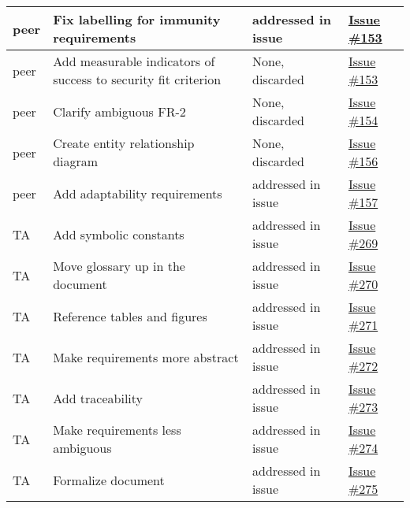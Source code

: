 \documentclass{article}
\begin{document}
\begin{longtable}{|p{2cm}|p{3.5cm}|p{4.5cm}|p{3cm}|}
peer & Fix labelling for immunity requirements & addressed in issue & \href{https://github.com/ssm-lab/capstone--source-code-optimizer/issues/153}{Issue \#153} \\
\hline

peer & Add measurable indicators of success to security fit criterion & None, discarded & \href{https://github.com/ssm-lab/capstone--source-code-optimizer/issues/153}{Issue \#153} \\
\hline

peer & Clarify ambiguous FR-2 & None, discarded & \href{https://github.com/ssm-lab/capstone--source-code-optimizer/issues/154}{Issue \#154} \\
\hline

peer & Create entity relationship diagram & None, discarded & \href{https://github.com/ssm-lab/capstone--source-code-optimizer/issues/156}{Issue \#156} \\
\hline

peer & Add adaptability requirements & addressed in issue & \href{https://github.com/ssm-lab/capstone--source-code-optimizer/issues/157}{Issue \#157} \\
\hline

TA & Add symbolic constants & addressed in issue & \href{https://github.com/ssm-lab/capstone--source-code-optimizer/issues/269}{Issue \#269} \\
\hline

TA & Move glossary up in the document & addressed in issue & \href{https://github.com/ssm-lab/capstone--source-code-optimizer/issues/270}{Issue \#270} \\
\hline

TA & Reference tables and figures & addressed in issue & \href{https://github.com/ssm-lab/capstone--source-code-optimizer/issues/271}{Issue \#271} \\
\hline

TA & Make requirements more abstract & addressed in issue & \href{https://github.com/ssm-lab/capstone--source-code-optimizer/issues/272}{Issue \#272} \\
\hline

TA & Add traceability & addressed in issue & \href{https://github.com/ssm-lab/capstone--source-code-optimizer/issues/273}{Issue \#273} \\
\hline

TA & Make requirements less ambiguous & addressed in issue & \href{https://github.com/ssm-lab/capstone--source-code-optimizer/issues/274}{Issue \#274} \\
\hline

TA & Formalize document & addressed in issue & \href{https://github.com/ssm-lab/capstone--source-code-optimizer/issues/275}{Issue \#275} \\
\hline
\end{longtable}
\end{document}
